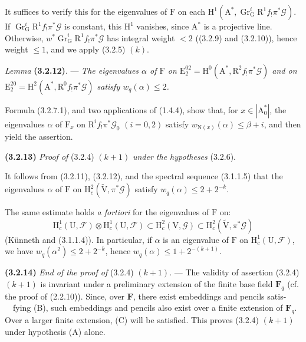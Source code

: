 \documentclass[11pt,leqno]{article}
\newcommand{\Page}[1]{\ifvmode\noindent\else\unskip\ \fi{\footnotesize\textcolor{gray}{[p.\,#1]}}\ \ignorespaces}
\begin{document}
It suffices to verify this for the eigenvalues of \(\mathrm{F}\) on each \(\mathrm{H}^1(\mathrm{A}^*,\operatorname{Gr}_{\mathrm{G}}^i\mathrm{R}^1f_!\pi^*\mathscr{G})\). If \(\operatorname{Gr}_{\mathrm{G}}^i\mathrm{R}^1f_!\pi^*\mathscr{G}\) is constant, this \(\mathrm{H}^1\) vanishes, since \(\mathrm{A}^*\) is a projective line. Otherwise, \(w^*\operatorname{Gr}_{\mathrm{G}}^i\mathrm{R}^1f_!\pi^*\mathscr{G}\) has integral weight \(<2\) ((3.2.9) and (3.2.10)), hence weight \(\leq1\), and we apply (3.2.5) \((k)\).

\textit{Lemma} \textbf{(3.2.12)}. — \textit{The eigenvalues \(\alpha\) of \(\mathrm{F}\) on \(\mathrm{E}_2^{02}=\mathrm{H}^0(\mathrm{A}^*,\mathrm{R}^2f_!\pi^*\mathscr{G})\) and on \(\mathrm{E}_2^{20}=\mathrm{H}^2(\mathrm{A}^*,\mathrm{R}^0f_!\pi^*\mathscr{G})\) satisfy \(w_q(\alpha)\leq2\).}

Formula (3.2.7.1), and two applications of (1.4.4), show that, for \(x\in|\mathrm{A}_0^*|\), the eigenvalues \(\alpha\) of \(\mathrm{F}_x\) on \(\mathrm{R}^if_!\pi^*\mathscr{G}_0\) \((i=0,2)\) satisfy \(w_{\mathrm{N}(x)}(\alpha)\leq\beta+i\), and then yield the assertion.

\textbf{(3.2.13)} \textit{Proof of} (3.2.4) \((k+1)\) \textit{under the hypotheses} (3.2.6).

It follows from (3.2.11), (3.2.12), and the spectral sequence (3.1.1.5) that the eigenvalues \(\alpha\) of \(\mathrm{F}\) on \(\mathrm{H}_c^2(\widetilde{\mathrm{V}},\pi^*\mathscr{G})\) satisfy \(w_q(\alpha)\leq2+2^{-k}\).

The same estimate holds \textit{a fortiori} for the eigenvalues of \(\mathrm{F}\) on:
\[
\mathrm{H}_c^1(\mathrm{U},\mathscr{F})\otimes
\mathrm{H}_c^1(\mathrm{U},\mathscr{F})
\subset\mathrm{H}_c^2(\mathrm{V},\mathscr{G})
\subset\mathrm{H}_c^2(\widetilde{\mathrm{V}},\pi^*\mathscr{G})
\]
(Künneth and (3.1.1.4)). In particular, if \(\alpha\) is an eigenvalue of \(\mathrm{F}\) on \(\mathrm{H}_c^1(\mathrm{U},\mathscr{F})\), we have \(w_q(\alpha^2)\leq2+2^{-k}\), hence \(w_q(\alpha)\leq1+2^{-(k+1)}\).

\textbf{(3.2.14)} \textit{End of the proof of} (3.2.4) \((k+1)\). — The validity of assertion (3.2.4) \((k+1)\) is invariant under a preliminary extension of the finite base field \(\mathbf{F}_q\) (cf. the proof of (2.2.10)). Since, over \(\mathbf{F}\), there exist embeddings and pencils satis-\Page{204}fying (B), such embeddings and pencils also exist over a finite extension of \(\mathbf{F}_q\). Over a larger finite extension, (C) will be satisfied. This proves (3.2.4) \((k+1)\) under hypothesis (A) alone.
\end{document}
